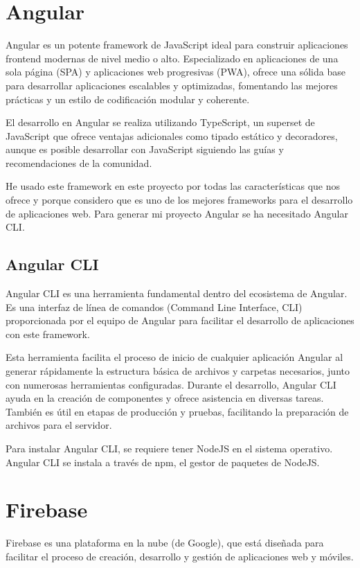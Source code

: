 

\section{Angular}
Angular \cite{angular} es un potente framework de JavaScript ideal para construir aplicaciones frontend modernas de nivel medio o alto. Especializado en aplicaciones de una sola página (SPA) y aplicaciones web progresivas (PWA), ofrece una sólida base para desarrollar aplicaciones escalables y optimizadas, fomentando las mejores prácticas y un estilo de codificación modular y coherente.

El desarrollo en Angular se realiza utilizando TypeScript, un superset de JavaScript que ofrece ventajas adicionales como tipado estático y decoradores, aunque es posible desarrollar con JavaScript siguiendo las guías y recomendaciones de la comunidad.

He usado este framework en este proyecto por todas las características que nos ofrece y porque considero que es uno de los mejores frameworks para el desarrollo de aplicaciones web. Para generar mi proyecto Angular se ha necesitado Angular CLI.


\subsection{Angular CLI}
Angular CLI \cite{cli} es una herramienta fundamental dentro del ecosistema de Angular. Es una interfaz de línea de comandos (Command Line Interface, CLI) proporcionada por el equipo de Angular para facilitar el desarrollo de aplicaciones con este framework.

Esta herramienta facilita el proceso de inicio de cualquier aplicación Angular al generar rápidamente la estructura básica de archivos y carpetas necesarios, junto con numerosas herramientas configuradas. Durante el desarrollo, Angular CLI ayuda en la creación de componentes y ofrece asistencia en diversas tareas. También es útil en etapas de producción y pruebas, facilitando la preparación de archivos para el servidor.

Para instalar Angular CLI, se requiere tener NodeJS en el sistema operativo. Angular CLI se instala a través de npm, el gestor de paquetes de NodeJS.


\section{Firebase}
Firebase \cite{firebase} es una plataforma en la nube (de Google), que está diseñada para facilitar el proceso de creación, desarrollo y gestión de aplicaciones web y móviles.

